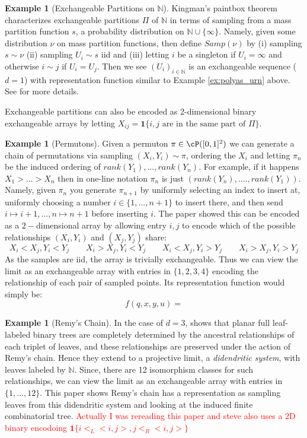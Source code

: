 \documentclass[11pt,oneside,reqno]{article}
\theoremstyle{plain}
\theoremstyle{definition}
\newtheorem{example}[theorem]{Example}
\numberwithin{equation}{section}
\renewcommand{\cite}{\citet}
\newcommand{\N}{\mathbb{N}}
\newcommand{\red}{\textcolor{red}}
\newcommand{\ind}{\mathbf{1}}
\begin{document}
\begin{example}[Exchangeable Partitions on $\N$] 
Kingman's paintbox theorem characterizes exchangeable partitions $\Pi$ of $\N$ in terms of sampling from a mass partition function $s$, a probability distribution on $\N \cup \{\infty\}$. Namely, given some distribution $\nu$ on mass partition functions, then define $Samp(\nu)$ by (i) sampling $s \sim \nu$ (ii) sampling $U_i \sim s$ iid and (iii) letting $i$ be a singleton if $U_i = \infty$ and otherwise $i \sim j$ if $U_i = U_j$. Then we see $(U_i)_{i \in \N}$ is an exchangeable sequence ($d=1$) with representation function similar to Example \ref{ex:polyas_urn} above. See \cite{Austin_arrays} for more details.

Exchangeable partitions can also be encoded as 2-dimensional binary exchangeable arrays by letting $X_{ij} = \ind \{i, j \text{ are in the same part of }\Pi\}$. 

\end{example}


\begin{example}[Permutons]
Given a permuton $\pi \in \cP([0,1]^2)$ we can generate a chain of permutations via sampling $(X_i, Y_i) \sim \pi$, ordering the $X_i$ and letting $\pi_n$ be the induced ordering of $rank(Y_1),..., rank(Y_n)$. For example, if it happens $X_1 > ... > X_n$ then in one-line notation $\pi_n$ is just $(rank(Y_n),...., rank(Y_1))$. Namely, given $\pi_n$ you generate $\pi_{n+1}$ by uniformly selecting an index to insert at, uniformly choosing a number $i \in \{1,..., n+1\}$ to insert there, and then send $i \mapsto i+1, ..., n \mapsto n+1$ before inserting $i$. The paper \cite{Grubel_2023_permutons} showed this can be encoded as a $2-$dimensional array by allowing entry $i, j$ to encode which of the possible relationships $(X_i, Y_i)$ and $(X_j, Y_j)$ share:
%
\[X_i < X_j, Y_i < Y_j \qquad X_i > X_j, Y_i < Y_j \qquad X_i < X_j, Y_i > Y_j \qquad X_i > X_j, Y_i > Y_j\]
%
\noindent As the samples are iid, the array is trivially exchangeable. Thus we can view the limit as an exchangeable array with entries in $\{1,2,3,4\}$ encoding the relationship of each pair of sampled points. Its representation function would simply be:
%
\[f(q, x,y, u) =  \]
%
\end{example}

\begin{example}[Remy's Chain]
    In the case of $d=3$, \cite{DM_Remy} shows that planar full leaf-labeled binary trees are completely determined by the ancestral relationships of each triplet of leaves, and these relationships are preserved under the action of Remy's chain. Hence they extend to a projective limit, a \textit{didendritic system}, with leaves labeled by $\N$. Since, there are 12 isomorphism classes for such relationships,  we can view the limit as an exchangeable array with entries in $\{1,...,12\}$. This paper shows Remy's chain has a representation as sampling leaves from this didendritic system and looking at the induced finite combinatorial tree. \red{Actually I was rereading this paper and steve also uses a 2D binary encodoing $\ind\{i <_L <i,j>, j <_R <i,j>\}$}
    
\end{example}
\end{document}
